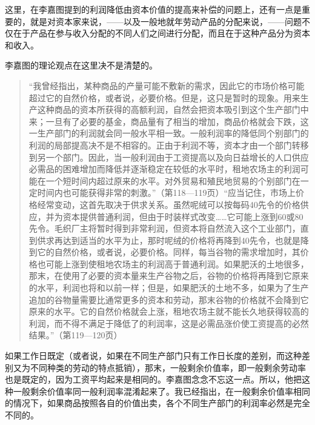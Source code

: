这里，在李嘉图提到的利润降低由资本价值的提高来补偿的问题上，还有一点是重要的，就是对资本家来说，——以及一般地就年劳动产品的分配来说，——问题不仅在于产品在参与收入分配的不同人们之间进行分配，而且在于这种产品分为资本和收入。



李嘉图的理论观点在这里决不是清楚的。

\begin{quote}{“我曾经指出，某种商品的产量可能不敷新的需求，因此它的市场价格可能超过它的自然价格，或者说，必要价格。但是，这只是暂时的现象。用来生产这种商品的资本所获得的高额利润，自然会把资本吸引到这个生产部门中来；一旦有了必要的基金，商品量有了相当的增加，商品价格就会下跌，这一生产部门的利润就会同一般水平相一致。一般利润率的降低同个别部门的利润的局部提高决不是不相容的。正由于利润不等，资本才由一个部门转移到另一个部门。因此，当一般利润由于工资提高以及向日益增长的人口供应必需品的困难增加而降低并逐渐稳定在较低的水平时，租地农场主的利润可能在一个短时间内超过原来的水平。对外贸易和殖民地贸易的个别部门在一定时间内也可能获得非常的刺激。”（第118—119页）“应当记住，市场上价格经常变动，这首先取决于供求关系。虽然呢绒可以按每码40先令的价格供应，并为资本提供普通利润，但由于时装样式改变……它可能上涨到60或80先令。毛织厂主将暂时得到非常利润，但资本将自然流入这个工业部门，直到供求再达到适当的水平为止，那时呢绒的价格将再降到40先令，也就是降到它的自然价格，或者说，必要价格。同样，每当谷物的需求增加时，其价格也可能上涨到使租地农场主的利润高于普通利润。如果肥沃的土地很多，那末，在使用了必要的资本量来生产谷物之后，谷物的价格将再降到它原来的水平，利润也将和以前一样；但是，如果肥沃的土地不多，如果为了生产追加的谷物量需要比通常更多的资本和劳动，那末谷物的价格就不会降到它原来的水平。它的自然价格就会上涨，租地农场主就不能长久地获得较高的利润，而不得不满足于降低了的利润率，这是必需品涨价使工资提高的必然结果。”（第119—120页）}\end{quote}

如果工作日既定（或者说，如果在不同生产部门只有工作日长度的差别，而这种差别又为不同种类的劳动的特点抵销），那末，一般剩余价值率，即一般剩余劳动率也是既定的，因为工资平均起来是相同的。李嘉图念念不忘这一点。所以，他把这种一般剩余价值率同一般利润率混淆起来了。我已经指出，在一般剩余价值率相同的情况下，如果商品按照各自的价值出卖，各个不同生产部门的利润率必然是完全不同的。


